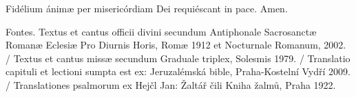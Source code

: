 \documentclass[a4paper, twoside, 12pt]{article}
\begin{document}
\pagebreak

\raggedcolumns

\cantusSineNeumas

\label{capitulum}
 


\trCapituliOmnes

\vfill



\noindent \trVersusLaudes

\vfill

\vfill




\vfill



\vfill


\vfill
\pagebreak


\trOrationis

\vfill


\vfill

\noindent \Vbardot{} Fidélium ánimæ per misericórdiam Dei requiéscant in pace.
\Rbardot{} Amen.

\vfill

\newpage
\RemoveSideThumbs
\pagestyle{empty}

\mbox{} %
\newpage %


\vspace*{5cm}

Fontes.
Textus et cantus officii divini secundum
Antiphonale Sacrosanctæ Romanæ Eclesiæ Pro Diurnis Horis, Romæ 1912
et Nocturnale Romanum, 2002. /
Textus et cantus missæ secundum
Graduale triplex, Solesmis 1979. /
Translatio capituli et lectioni sumpta est ex:
Jeruzalémská bible, Praha-Kostelní Vydří 2009. /
Translationes psalmorum ex
Hejčl Jan: Žaltář čili Kniha žalmů, Praha 1922.
\end{document}

